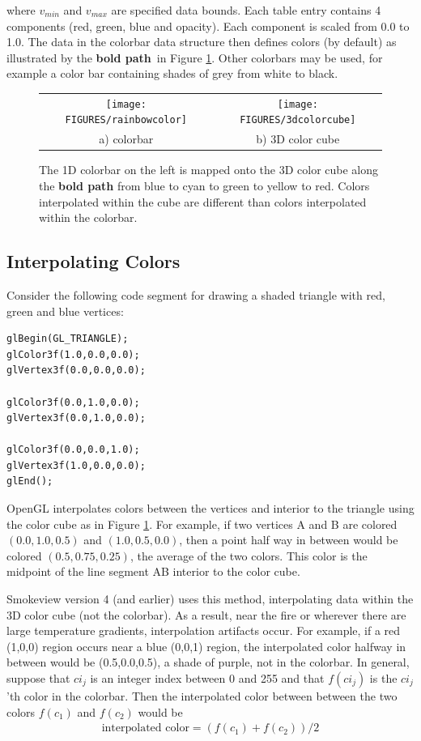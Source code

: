 \documentclass[11pt,twoside]{book}
\newcommand{\figoptions}{htp}
\begin{document}
\noindent where $v_{min}$ and $v_{max}$ are specified data bounds.  Each table entry contains 4 components (red, green, blue and opacity).  Each component is scaled from 0.0 to 1.0.  The data in the colorbar data structure then defines colors (by default) as illustrated by the {\bf bold path}\ in Figure \ref{colorbarinfo}.  Other colorbars may be used, for example a color bar containing shades of grey from white to black.


\begin{figure}[\figoptions]
\begin{center}
\begin{tabular}{cc}
\texttt{[image: FIGURES/rainbowcolor]}&\texttt{[image: FIGURES/3dcolorcube]}\\
a) colorbar&b) 3D color cube\\
\end{tabular}
\end{center}
\caption[1D colorbar and 3D color cube]{The 1D colorbar on the left is mapped onto the 3D color cube
along the {\bf bold path} from blue to cyan to green to yellow to red.  Colors interpolated within the cube are different than colors interpolated within the colorbar.}
\label{colorbarinfo}%
\end{figure}

\subsection{Interpolating Colors}

Consider the following code segment for drawing a shaded triangle with red, green and blue vertices:
\begin{verbatim}
glBegin(GL_TRIANGLE);
glColor3f(1.0,0.0,0.0);
glVertex3f(0.0,0.0,0.0);

glColor3f(0.0,1.0,0.0);
glVertex3f(0.0,1.0,0.0);

glColor3f(0.0,0.0,1.0);
glVertex3f(1.0,0.0,0.0);
glEnd();
\end{verbatim}

OpenGL interpolates colors between the vertices and interior to
the triangle using the color cube as in Figure \ref{colorbarinfo}.
For example, if two vertices A and B are colored $(0.0,1.0,0.5)$
and $(1.0,0.5,0.0)$, then a point half way in between would be
colored $(0.5,0.75,0.25)$, the average of the two colors.  This
color is the midpoint of the line segment AB interior to the color
cube.

Smokeview version 4 (and earlier) uses this method, interpolating
data within the 3D color cube (not the colorbar).  As a result,
near the fire or wherever there are large temperature gradients,
interpolation artifacts occur.  For example, if a red (1,0,0)
region occurs near a blue (0,0,1) region, the interpolated color
halfway in between would be (0.5,0.0,0.5), a shade of purple, not
in the colorbar.  In general, suppose that $ci_j$ is an integer
index between 0 and 255 and that $f(ci_j)$ is the $ci_j$'th color
in the colorbar.  Then the interpolated color between between the
two colors $f(c_1)$ and $f(c_2)$ would be
\begin{eqnarray*}
\mbox{interpolated color}=(f(c_1)+f(c_2))/2
\end{eqnarray*}
\end{document}
